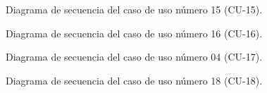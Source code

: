 \begin{figure}[htbp!]
	\begin{center}
		\caption{Diagrama de secuencia del caso de uso número 15 (CU-15).}
		\label{fig:Diagrama de secuencia CU-15}
	\end{center}
\end{figure}

\begin{figure}[htbp!]
	\begin{center}
		\caption{Diagrama de secuencia del caso de uso número 16 (CU-16).}
		\label{fig:Diagrama de secuencia CU-16}
	\end{center}
\end{figure}

\begin{figure}[htbp!]
	\begin{center}
		\caption{Diagrama de secuencia del caso de uso número 04 (CU-17).}
		\label{fig:Diagrama de secuencia CU-17}
	\end{center}
\end{figure}

\begin{figure}[htbp!]
	\begin{center}
		\caption{Diagrama de secuencia del caso de uso número 18 (CU-18).}
		\label{fig:Diagrama de secuencia CU-18}
	\end{center}
\end{figure}

